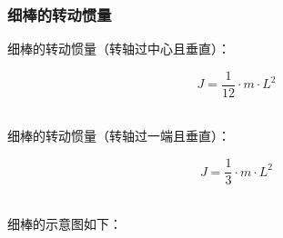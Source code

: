 \documentclass[UTF8]{ctexart}
\begin{document}
\subsubsection{细棒的转动惯量}
    细棒的转动惯量（转轴过中心且垂直）：
    \begin{large}
        \begin{equation*}
            J=\frac{1}{12}\cdot m\cdot L^2    
        \end{equation*}
    \end{large}\\
    细棒的转动惯量（转轴过一端且垂直）：
    \begin{large}
        \begin{equation*}
            J=\frac{1}{3}\cdot m\cdot L^2    
        \end{equation*}
    \end{large}\\
    细棒的示意图如下：
\end{document}

